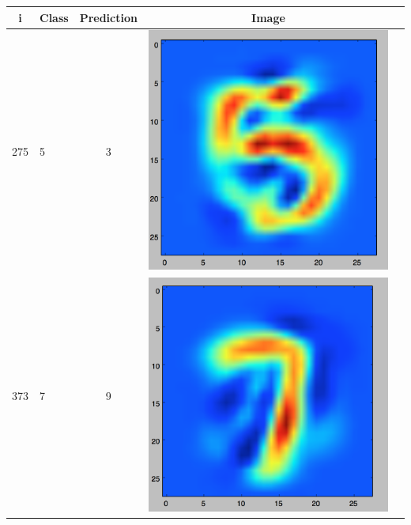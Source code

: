 \documentclass[11pt]{article}
\begin{document}
\begin{table}[!th]
\centering
\begin{tabular}{|clc|c||c|}
\hline
i & Class & Prediction & Image \\
\hline
275 & 5 & 3 & \includegraphics[scale=.2]{images/logit_5_3.png} \\
\hline
373 & 7 & 9 & \includegraphics[scale=.2]{images/logit_7_9.png} \\

\end{tabular}
\end{table}
\end{document}
